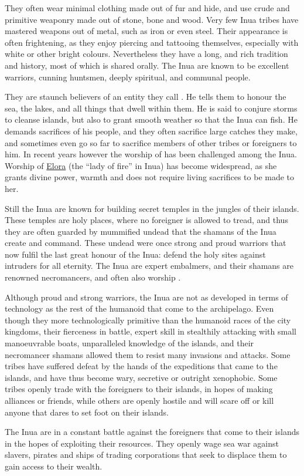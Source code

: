 They often wear minimal clothing made out of fur and hide, and use crude and
primitive weaponry made out of stone, bone and wood. Very few Inua tribes have
mastered weapons out of metal, such as iron or even steel. Their appearance is
often frightening, as they enjoy piercing and tattooing themselves, especially
with white or other bright colours. Nevertheless they have a long, and rich
tradition and history, most of which is shared orally. The Inua are known to
be excellent warriors, cunning huntsmen, deeply spiritual, and communal people.

They are staunch believers of an entity they call .
He tells them to honour the sea, the lakes, and all things that dwell within
them. He is said to conjure storms to cleanse islands, but also to grant
smooth weather so that the Inua can fish. He demands sacrifices of his people,
and they often sacrifice large catches they make, and sometimes even go so
far to sacrifice members of other tribes or foreigners to him. In recent years
however the worship of  has been challenged among the
Inua. Worship of \hyperref[sec:Forun]{Elora} (the ``lady of fire'' in Inua)
has become widespread, as she grants divine power, warmth and does not require
living sacrifices to be made to her.

Still the Inua are known for building secret temples in the jungles of their
islands. These temples are holy places, where no foreigner is allowed to
tread, and thus they are often guarded by mummified undead that the shamans of
the Inua create and command. These undead were once strong and proud warriors
that now fulfil the last great honour of the Inua: defend the holy sites
against intruders for all eternity. The Inua are expert embalmers, and their
shamans are renowned necromancers, and often also worship .

Although proud and strong warriors, the Inua are not as developed in terms of
technology as the rest of the humanoid that come to the archipelago. Even
though they more technologically primitive than the humanoid races of the city
kingdoms, their fierceness in battle, expert skill in stealthily attacking
with small manoeuvrable boats, unparalleled knowledge of the islands, and
their necromancer shamans allowed them to resist many invasions and
attacks. Some tribes have suffered defeat by the hands of the expeditions that
came to the islands, and have thus become wary, secretive or outright
xenophobic. Some tribes openly trade with the foreigners to their islands, in
hopes of making alliances or friends, while others are openly hostile and will
scare off or kill anyone that dares to set foot on their islands.

The Inua are in a constant battle against the foreigners that come to their
islands in the hopes of exploiting their resources. They openly wage sea
war against slavers, pirates and ships of trading corporations that seek
to displace them to gain access to their wealth.
